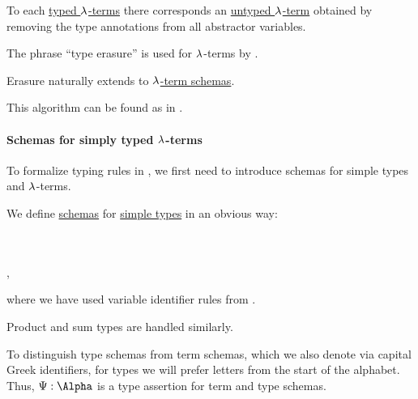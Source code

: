 \begin{algorithm}\label{alg:type_erasure}
  To each \hyperref[def:typed_lambda_term]{typed \( \mathrm{\lambda} \)-terms} there corresponds an \hyperref[def:lambda_term]{untyped \( \mathrm{\lambda} \)-term} obtained by removing the type annotations from all abstractor variables.
\end{algorithm}
\begin{comments}
  \item The phrase \enquote{type erasure} is used for \( \mathrm{\lambda} \)-terms by .
  \item Erasure naturally extends to \hyperref[def:simple_type_schema]{\( \mathrm{\lambda} \)-term schemas}.
  \item This algorithm can be found as  in \cite{notebook:code}.
\end{comments}

\paragraph{Schemas for simply typed \( \mathrm{\lambda} \)-terms}\hfill

To formalize typing rules in , we first need to introduce schemas for simple types and \( \mathrm{\lambda} \)-terms.

\begin{definition}\label{def:simple_type_schema}
  We define \hyperref[con:schemas_and_instances]{schemas} for \hyperref[def:simple_type]{simple types} in an obvious way:
  \begin{bnf*}
        {} \\
       {\bnftsq{(} \bnfsp {} \bnfsp \bnftsq{\( \synimplies \)} \bnfsp {} \bnfsp \bnftsq{)}} \\
             { \bnfor {} \bnfor {}},
  \end{bnf*}
  where we have used variable identifier rules from .

  Product and sum types are handled similarly.
\end{definition}
\begin{comments}
  \item To distinguish type schemas from term schemas, which we also denote via capital Greek identifiers, for types we will prefer letters from the start of the alphabet. Thus, \( \Psi: \Alpha \) is a type assertion for term and type schemas.
\end{comments}

